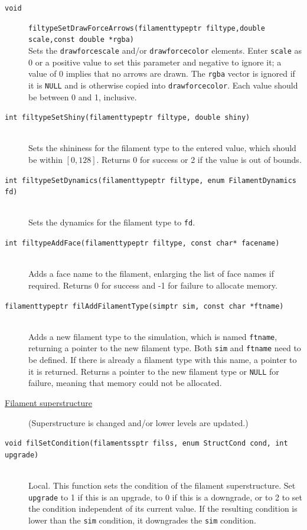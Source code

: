 \documentclass {scrbook}
\newcommand {\ttt} {\texttt}
\begin{document}
\begin{description}
\item[\ttt{void}]
\ttt{filtypeSetDrawForceArrows(filamenttypeptr filtype,double scale,const double *rgba)}
\hfill \\
Sets the \ttt{drawforcescale} and/or \ttt{drawforcecolor} elements. Enter \ttt{scale} as 0 or a positive value to set this parameter and negative to ignore it; a value of 0 implies that no arrows are drawn. The \ttt{rgba} vector is ignored if it is \ttt{NULL} and is otherwise copied into \ttt{drawforcecolor}. Each value should be between 0 and 1, inclusive.

\item[\ttt{int filtypeSetShiny(filamenttypeptr filtype, double shiny)}]
\hfill \\
Sets the shininess for the filament type to the entered value, which should be within $[0,128]$. Returns 0 for success or 2 if the value is out of bounds.

\item[\ttt{int filtypeSetDynamics(filamenttypeptr filtype, enum FilamentDynamics fd)}]
\hfill \\
Sets the dynamics for the filament type to \ttt{fd}.

\item[\ttt{int filtypeAddFace(filamenttypeptr filtype, const char* facename)}]
\hfill \\
Adds a face name to the filament, enlarging the list of face names if required. Returns 0 for success and -1 for failure to allocate memory.

\item[\ttt{filamenttypeptr filAddFilamentType(simptr sim, const char *ftname)}]
\hfill \\
Adds a new filament type to the simulation, which is named \ttt{ftname}, returning a pointer to the new filament type. Both \ttt{sim} and \ttt{ftname} need to be defined. If there is already a filament type with this name, a pointer to it is returned. Returns a pointer to the new filament type or \ttt{NULL} for failure, meaning that memory could not be allocated.


\item[\underline{Filament superstructure}]
(Superstructure is changed and/or lower levels are updated.)

\item[\ttt{void filSetCondition(filamentssptr filss, enum StructCond cond, int upgrade)}]
\hfill \\
Local. This function sets the condition of the filament superstructure. Set \ttt{upgrade} to 1 if this is an upgrade, to 0 if this is a downgrade, or to 2 to set the condition independent of its current value. If the resulting condition is lower than the \ttt{sim} condition, it downgrades the \ttt{sim} condition.


\end{description}
\end{document}
